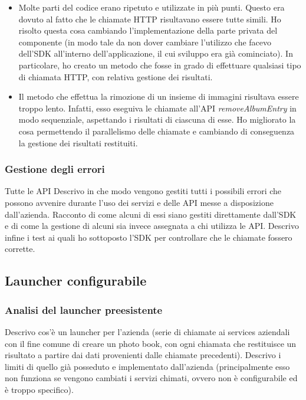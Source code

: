 				\begin{itemize}
					\item Molte parti del codice erano ripetuto e utilizzate in più punti. Questo era dovuto al fatto che le
					chiamate HTTP risultavano essere tutte simili. Ho risolto questa cosa cambiando l'implementazione della parte
					privata del componente (in modo tale da non dover cambiare l'utilizzo che facevo dell'SDK all'interno
					dell'applicazione, il cui sviluppo era già cominciato). In particolare, ho creato un metodo che fosse in
					grado di effettuare qualsiasi tipo di chiamata HTTP, con relativa gestione dei risultati.
					\item Il metodo che effettua la rimozione di un insieme di immagini risultava essere troppo lento. Infatti,
					esso eseguiva le chiamate all'API \emph{removeAlbumEntry} in modo sequenziale, aspettando i risultati di
					ciascuna di esse. Ho migliorato la cosa permettendo il parallelismo delle chiamate e cambiando di conseguenza
					la gestione dei risultati restituiti.
				\end{itemize}
			\subsubsection{Gestione degli errori}
				Tutte le API
				Descrivo in che modo vengono gestiti tutti i possibili errori che possono avvenire durante l'uso dei servizi e delle
				API messe a disposizione dall'azienda. Racconto di come alcuni di essi siano gestiti direttamente dall'SDK e di come
				la gestione di alcuni sia invece assegnata a chi utilizza le API. Descrivo infine i test ai quali ho sottoposto
				l'SDK per controllare che le chiamate fossero corrette.
		\subsection{Launcher configurabile}
			\subsubsection{Analisi del launcher preesistente}
				Descrivo cos'è un launcher per l'azienda (serie di chiamate ai services aziendali con il fine comune di creare un
				photo book, con ogni chiamata che restituisce un risultato a partire dai dati provenienti dalle chiamate precedenti).
				Descrivo i limiti di quello già posseduto e implementato dall'azienda (principalmente esso non funziona se vengono
				cambiati i servizi chimati, ovvero non è configurabile ed è troppo specifico).
